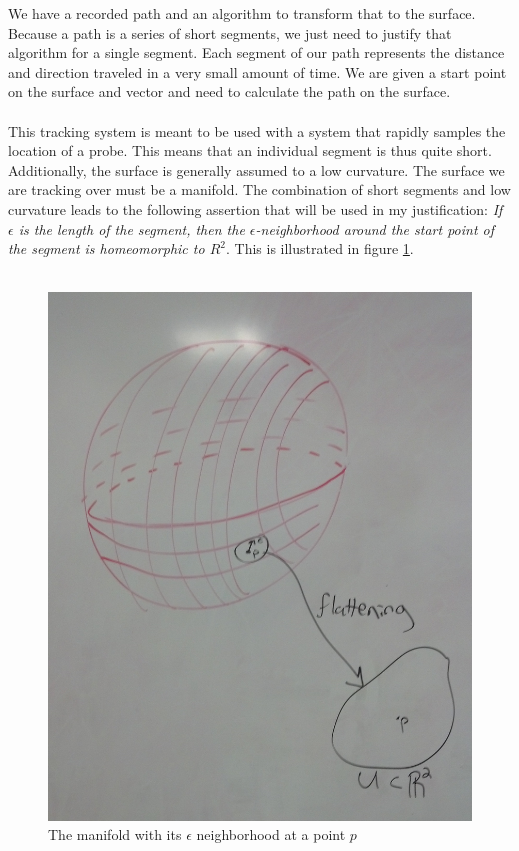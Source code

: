 \documentclass[conference]{acmsiggraph}
\begin{document}
We have a recorded path and an algorithm to transform that to the surface. Because a path is a series of short segments, we just need to justify that algorithm for a single segment. Each segment of our path represents the distance and direction traveled in a very small amount of time. We are given a start point on the surface and vector and need to calculate the path on the surface. \\
\\
This tracking system is meant to be used with a system that rapidly samples the location of a probe. This means that an individual segment is thus quite short. Additionally, the surface is generally assumed to a low curvature. The surface we are tracking over must be a manifold. The combination of short segments and low curvature leads to the following assertion that will be used in my justification: {\it If $\epsilon$ is the length of the segment, then the $\epsilon$-neighborhood around the start point of the segment is homeomorphic to $R^2$}. This is illustrated in figure \ref{manifolddiagram}.\\
\\
\begin{figure}[ht]
\centering
\includegraphics[width=\columnwidth]{manifolddiagram.jpg}
\caption{The manifold with its $\epsilon$ neighborhood at a point $p$}
\label{manifolddiagram}
\end{figure}
\end{document}
